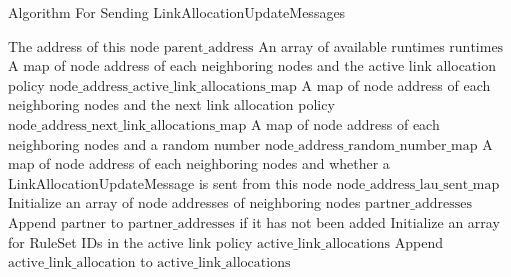 \begin{algorithm}[H]
  \begin{minipage}{0.8\linewidth}
  \caption{Algorithm For Sending LinkAllocationUpdateMessages}
  \begin{algorithmic}[1]
\Require The address of this node $\text{parent\_address}$
  \Require An array of available runtimes $\text{runtimes}$
  \Require A map of node address of each neighboring nodes and the active link allocation policy $\text{node\_address\_active\_link\_allocations\_map}$
  \Require A map of node address of each neighboring nodes and the next link allocation policy $\text{node\_address\_next\_link\_allocations\_map}$
  \Require A map of node address of each neighboring nodes and a random number $\text{node\_address\_random\_number\_map}$
  \Require A map of node address of each neighboring nodes and whether a LinkAllocationUpdateMessage is sent from this node $\text{node\_address\_lau\_sent\_map}$
    \State Initialize an array of node addresses of neighboring nodes $\text{partner\_addresses}$
      \State Append $\text{partner}$ to $\text{partner\_addresses}$ if it has not been added
      \EndFor
    \EndFor
      \State Initialize an array for RuleSet IDs in the active link policy $\text{active\_link\_allocations}$
            \State Append $\text{active\_link\_allocation}$ to $\text{active\_link\_allocations}$
          \EndFor
        \EndIf
      \end{algorithmic}
    \end{minipage}
    \end{algorithm}

